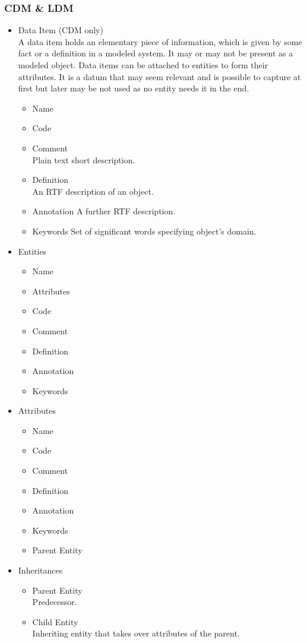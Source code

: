 \subsubsection{CDM \& LDM}

\begin{itemize}
	\item Data Item (CDM only) \\
	A data item holds an elementary piece of information, which is given by some fact or a definition in a modeled system. It may or may not be present as a modeled object. Data items can be attached to entities to form their attributes. It is a datum that may seem relevant and is possible to capture at first but later may be not used as no entity needs it in the end.
	\begin{itemize}
		\item Name
		\item Code
		\item Comment \\
		Plain text short description.
		\item Definition \\
		An RTF description of an object.
		\item Annotation
		A further RTF description.
		\item Keywords
		Set of significant words specifying object's domain.
	\end{itemize}
	\item Entities
	\begin{itemize}
		\item Name 
		\item Attributes
		\item Code 
		\item Comment
		\item Definition
		\item Annotation
		\item Keywords
	\end{itemize}
	\item Attributes
	\begin{itemize}
		\item Name 
		\item Code 
		\item Comment
		\item Definition
		\item Annotation
		\item Keywords
		\item Parent Entity
	\end{itemize}
	\item Inheritances
	\begin{itemize}
		\item Parent Entity \\ 
		Predecessor.
		\item Child Entity \\ 
		Inheriting entity that takes over attributes of the parent.
	\end{itemize}
\end{itemize}

